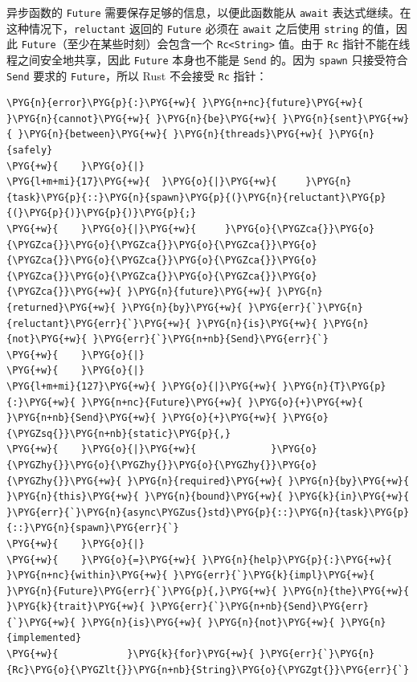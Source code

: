 异步函数的 \texttt{Future} 需要保存足够的信息，以便此函数能从 \texttt{await} 表达式继续。在这种情况下，\texttt{reluctant} 返回的 \texttt{Future} 必须在 \texttt{await} 之后使用 \texttt{string} 的值，因此 \texttt{Future}（至少在某些时刻）会包含一个 \texttt{Rc<String>} 值。由于 \texttt{Rc} 指针不能在线程之间安全地共享，因此 \texttt{Future} 本身也不能是 \texttt{Send} 的。因为 \texttt{spawn} 只接受符合 \texttt{Send} 要求的 \texttt{Future}，所以 Rust 不会接受 \texttt{Rc} 指针：

\begin{Verbatim}[commandchars=\\\{\},breaklines=true,breakanywhere=true,fontsize=\codefont,xleftmargin=17bp]
\PYG{n}{error}\PYG{p}{:}\PYG{+w}{ }\PYG{n+nc}{future}\PYG{+w}{ }\PYG{n}{cannot}\PYG{+w}{ }\PYG{n}{be}\PYG{+w}{ }\PYG{n}{sent}\PYG{+w}{ }\PYG{n}{between}\PYG{+w}{ }\PYG{n}{threads}\PYG{+w}{ }\PYG{n}{safely}
\PYG{+w}{    }\PYG{o}{|}
\PYG{l+m+mi}{17}\PYG{+w}{  }\PYG{o}{|}\PYG{+w}{     }\PYG{n}{task}\PYG{p}{::}\PYG{n}{spawn}\PYG{p}{(}\PYG{n}{reluctant}\PYG{p}{(}\PYG{p}{)}\PYG{p}{)}\PYG{p}{;}
\PYG{+w}{    }\PYG{o}{|}\PYG{+w}{     }\PYG{o}{\PYGZca{}}\PYG{o}{\PYGZca{}}\PYG{o}{\PYGZca{}}\PYG{o}{\PYGZca{}}\PYG{o}{\PYGZca{}}\PYG{o}{\PYGZca{}}\PYG{o}{\PYGZca{}}\PYG{o}{\PYGZca{}}\PYG{o}{\PYGZca{}}\PYG{o}{\PYGZca{}}\PYG{o}{\PYGZca{}}\PYG{+w}{ }\PYG{n}{future}\PYG{+w}{ }\PYG{n}{returned}\PYG{+w}{ }\PYG{n}{by}\PYG{+w}{ }\PYG{err}{`}\PYG{n}{reluctant}\PYG{err}{`}\PYG{+w}{ }\PYG{n}{is}\PYG{+w}{ }\PYG{n}{not}\PYG{+w}{ }\PYG{err}{`}\PYG{n+nb}{Send}\PYG{err}{`}
\PYG{+w}{    }\PYG{o}{|}
\PYG{+w}{    }\PYG{o}{|}
\PYG{l+m+mi}{127}\PYG{+w}{ }\PYG{o}{|}\PYG{+w}{ }\PYG{n}{T}\PYG{p}{:}\PYG{+w}{ }\PYG{n+nc}{Future}\PYG{+w}{ }\PYG{o}{+}\PYG{+w}{ }\PYG{n+nb}{Send}\PYG{+w}{ }\PYG{o}{+}\PYG{+w}{ }\PYG{o}{\PYGZsq{}}\PYG{n+nb}{static}\PYG{p}{,}
\PYG{+w}{    }\PYG{o}{|}\PYG{+w}{             }\PYG{o}{\PYGZhy{}}\PYG{o}{\PYGZhy{}}\PYG{o}{\PYGZhy{}}\PYG{o}{\PYGZhy{}}\PYG{+w}{ }\PYG{n}{required}\PYG{+w}{ }\PYG{n}{by}\PYG{+w}{ }\PYG{n}{this}\PYG{+w}{ }\PYG{n}{bound}\PYG{+w}{ }\PYG{k}{in}\PYG{+w}{ }\PYG{err}{`}\PYG{n}{async\PYGZus{}std}\PYG{p}{::}\PYG{n}{task}\PYG{p}{::}\PYG{n}{spawn}\PYG{err}{`}
\PYG{+w}{    }\PYG{o}{|}
\PYG{+w}{    }\PYG{o}{=}\PYG{+w}{ }\PYG{n}{help}\PYG{p}{:}\PYG{+w}{ }\PYG{n+nc}{within}\PYG{+w}{ }\PYG{err}{`}\PYG{k}{impl}\PYG{+w}{ }\PYG{n}{Future}\PYG{err}{`}\PYG{p}{,}\PYG{+w}{ }\PYG{n}{the}\PYG{+w}{ }\PYG{k}{trait}\PYG{+w}{ }\PYG{err}{`}\PYG{n+nb}{Send}\PYG{err}{`}\PYG{+w}{ }\PYG{n}{is}\PYG{+w}{ }\PYG{n}{not}\PYG{+w}{ }\PYG{n}{implemented}
\PYG{+w}{            }\PYG{k}{for}\PYG{+w}{ }\PYG{err}{`}\PYG{n}{Rc}\PYG{o}{\PYGZlt{}}\PYG{n+nb}{String}\PYG{o}{\PYGZgt{}}\PYG{err}{`}

\end{Verbatim}
